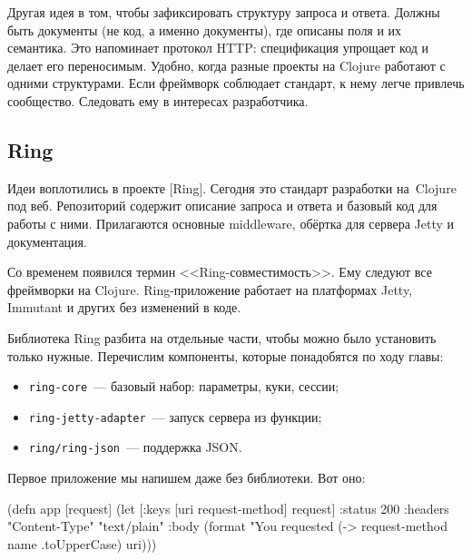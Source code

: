 Другая идея в том, чтобы зафиксировать структуру запроса и ответа. Должны быть
документы (не код, а именно документы), где описаны поля и их семантика. Это
напоминает протокол HTTP: спецификация упрощает код и делает его
переносимым. Удобно, когда разные проекты на Clojure работают с одними
структурами. Если фреймворк соблюдает стандарт, к нему легче привлечь
сообщество. Следовать ему в интересах разработчика.

\subsection{Ring}

\label{ring-jetty}

Идеи воплотились в проекте [Ring].
Сегодня это стандарт разработки на~Clojure под веб. Репозиторий содержит описание
запроса и ответа и базовый код для работы с ними. Прилагаются основные middleware,
обёртка для сервера Jetty и документация.


Со временем появился термин <<Ring-совместимость>>. Ему следуют все фреймворки
на Clojure. Ring-приложение работает на платформах Jetty, Immutant и других без
изменений в коде.

Библиотека Ring разбита на отдельные части, чтобы можно было установить только
нужные. Перечислим компоненты, которые понадобятся по ходу главы:

\begin{itemize}

\item
  \verb|ring-core|~--- базовый набор: параметры, куки, сессии;

\item
  \verb|ring-jetty-adapter|~--- запуск сервера из функции;

\item
  \verb|ring/ring-json|~--- поддержка JSON.

\end{itemize}

Первое приложение мы напишем даже без библиотеки. Вот оно:


\label{first-handler}


\ifx\devicetype\mobile

\begin{english}
  \begin{clojure}
(defn app [request]
 (let [{:keys [uri request-method]}
      request]
  {:status 200
   :headers {"Content-Type" "text/plain"}
   :body (format "You requested %
           (-> request-method
               name
               .toUpperCase)
           uri)}))
  \end{clojure}
\end{english}

